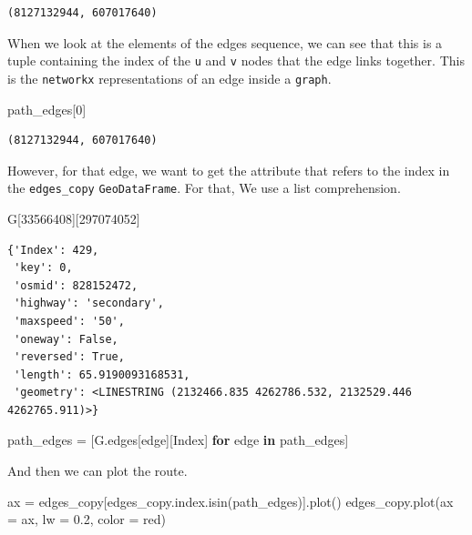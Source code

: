 \documentclass[
  letterpaper,
  DIV=11,
  numbers=noendperiod]{scrreprt}
\newenvironment{Shaded}{\begin{snugshade}}{\end{snugshade}}
\newcommand{\ControlFlowTok}[1]{\textcolor[rgb]{0.00,0.23,0.31}{\textbf{#1}}}
\newcommand{\DecValTok}[1]{\textcolor[rgb]{0.68,0.00,0.00}{#1}}
\newcommand{\FloatTok}[1]{\textcolor[rgb]{0.68,0.00,0.00}{#1}}
\newcommand{\KeywordTok}[1]{\textcolor[rgb]{0.00,0.23,0.31}{\textbf{#1}}}
\newcommand{\NormalTok}[1]{\textcolor[rgb]{0.00,0.23,0.31}{#1}}
\newcommand{\OperatorTok}[1]{\textcolor[rgb]{0.37,0.37,0.37}{#1}}
\newcommand{\StringTok}[1]{\textcolor[rgb]{0.13,0.47,0.30}{#1}}
\begin{document}
\begin{verbatim}
(8127132944, 607017640)
\end{verbatim}

When we look at the elements of the edges sequence, we can see that this
is a tuple containing the index of the \texttt{u} and \texttt{v} nodes
that the edge links together. This is the \texttt{networkx}
representations of an edge inside a \texttt{graph}.

\begin{Shaded}
\begin{Highlighting}[]
\NormalTok{path\_edges[}\DecValTok{0}\NormalTok{]}
\end{Highlighting}
\end{Shaded}

\begin{verbatim}
(8127132944, 607017640)
\end{verbatim}

However, for that edge, we want to get the attribute that refers to the
index in the \texttt{edges\_copy} \texttt{GeoDataFrame}. For that, We
use a list comprehension.

\begin{Shaded}
\begin{Highlighting}[]
\NormalTok{G[}\DecValTok{33566408}\NormalTok{][}\DecValTok{297074052}\NormalTok{]}
\end{Highlighting}
\end{Shaded}

\begin{verbatim}
{'Index': 429,
 'key': 0,
 'osmid': 828152472,
 'highway': 'secondary',
 'maxspeed': '50',
 'oneway': False,
 'reversed': True,
 'length': 65.9190093168531,
 'geometry': <LINESTRING (2132466.835 4262786.532, 2132529.446 4262765.911)>}
\end{verbatim}

\begin{Shaded}
\begin{Highlighting}[]
\NormalTok{path\_edges }\OperatorTok{=}\NormalTok{ [G.edges[edge][}\StringTok{\textquotesingle{}Index\textquotesingle{}}\NormalTok{] }\ControlFlowTok{for}\NormalTok{ edge }\KeywordTok{in}\NormalTok{ path\_edges]}
\end{Highlighting}
\end{Shaded}

And then we can plot the route.

\begin{Shaded}
\begin{Highlighting}[]
\NormalTok{ax }\OperatorTok{=}\NormalTok{ edges\_copy[edges\_copy.index.isin(path\_edges)].plot()}
\NormalTok{edges\_copy.plot(ax }\OperatorTok{=}\NormalTok{ ax, lw }\OperatorTok{=} \FloatTok{0.2}\NormalTok{, color }\OperatorTok{=} \StringTok{\textquotesingle{}red\textquotesingle{}}\NormalTok{)}
\end{Highlighting}
\end{Shaded}
\end{document}
